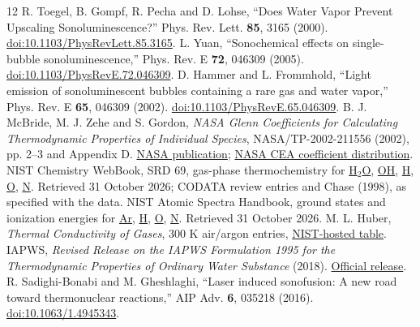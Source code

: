 \documentclass[10pt,a4paper]{article}
\begin{document}
\newpage
\begin{thebibliography}{12}\small
{} R. Toegel, B. Gompf, R. Pecha and D. Lohse, ``Does Water Vapor Prevent Upscaling Sonoluminescence?'' Phys. Rev. Lett. \textbf{85}, 3165 (2000). \href{https://doi.org/10.1103/PhysRevLett.85.3165}{doi:10.1103/PhysRevLett.85.3165}.
 L. Yuan, ``Sonochemical effects on single-bubble sonoluminescence,'' Phys. Rev. E \textbf{72}, 046309 (2005). \href{https://doi.org/10.1103/PhysRevE.72.046309}{doi:10.1103/PhysRevE.72.046309}.
 D. Hammer and L. Frommhold, ``Light emission of sonoluminescent bubbles containing a rare gas and water vapor,'' Phys. Rev. E \textbf{65}, 046309 (2002). \href{https://doi.org/10.1103/PhysRevE.65.046309}{doi:10.1103/PhysRevE.65.046309}.
 B. J. McBride, M. J. Zehe and S. Gordon, \emph{NASA Glenn Coefficients for Calculating Thermodynamic Properties of Individual Species}, NASA/TP-2002-211556 (2002), pp. 2--3 and Appendix D. \href{https://ntrs.nasa.gov/citations/20020085330}{NASA publication}; \href{https://github.com/nasa/cea/blob/main/data/thermo.inp}{NASA CEA coefficient distribution}.
 NIST Chemistry WebBook, SRD 69, gas-phase thermochemistry for \href{https://webbook.nist.gov/cgi/cbook.cgi?ID=C7732185\&Units=SI\&Mask=1}{H$_2$O}, \href{https://webbook.nist.gov/cgi/cbook.cgi?ID=C3352576\&Units=SI\&Mask=1}{OH}, \href{https://webbook.nist.gov/cgi/cbook.cgi?ID=C12385136\&Units=SI\&Mask=1}{H}, \href{https://webbook.nist.gov/cgi/cbook.cgi?ID=C17778802\&Units=SI\&Mask=1}{O}, \href{https://webbook.nist.gov/cgi/cbook.cgi?ID=C17778880\&Units=SI\&Mask=1}{N}. Retrieved 31 October 2026; CODATA review entries and Chase (1998), as specified with the data.
 NIST Atomic Spectra Handbook, ground states and ionization energies for \href{https://physics.nist.gov/PhysRefData/Handbook/Tables/argontable1.htm}{Ar}, \href{https://physics.nist.gov/PhysRefData/Handbook/Tables/hydrogentable1.htm}{H}, \href{https://physics.nist.gov/PhysRefData/Handbook/Tables/oxygentable1.htm}{O}, \href{https://physics.nist.gov/PhysRefData/Handbook/Tables/nitrogentable1.htm}{N}. Retrieved 31 October 2026.
 M. L. Huber, \emph{Thermal Conductivity of Gases}, 300 K air/argon entries, \href{https://tsapps.nist.gov/publication/get_pdf.cfm?pub_id=926438}{NIST-hosted table}.
 IAPWS, \emph{Revised Release on the IAPWS Formulation 1995 for the Thermodynamic Properties of Ordinary Water Substance} (2018). \href{https://iapws.org/technical-guidance/release/IAPWS-95}{Official release}.
 R. Sadighi-Bonabi and M. Gheshlaghi, ``Laser induced sonofusion: A new road toward thermonuclear reactions,'' AIP Adv. \textbf{6}, 035218 (2016). \href{https://doi.org/10.1063/1.4945343}{doi:10.1063/1.4945343}.

\end{thebibliography}
\end{document}
